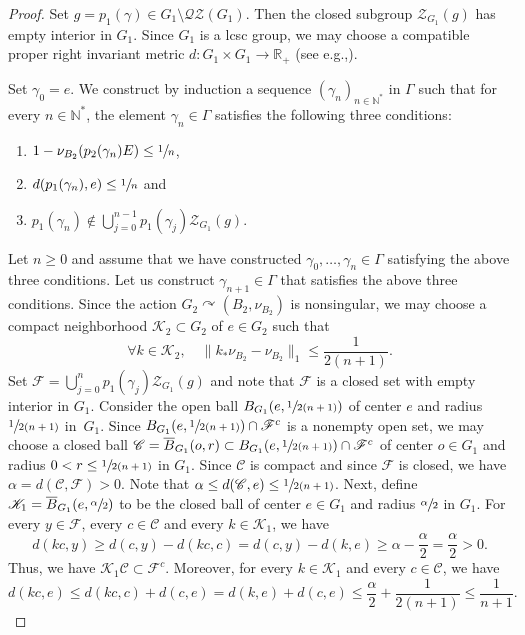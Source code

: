 \documentclass[11pt]{article}
\newcommand{\eg}{e.g.,\xspace}
\newenvironment{enumeratei}
{\bgroup\def\theenumi{\roman{enumi}}\def\theenumii{\arabic{enumii}}\begin{enumerate}}
{\end{enumerate}\egroup}
\theoremstyle{definition}
\newcommand{\R}{\mathbb{R}}
\newcommand{\N}{\mathbb{N}}
\begin{document}
\begin{proof}
Set $g = p_1(\gamma) \in G_1\setminus \mathscr{Q}\mathscr{Z}(G_1)$. Then the closed subgroup $\mathscr Z_{G_1}(g)$ has empty interior in $G_1$. Since $G_1$ is a lcsc group, we may choose a compatible proper right invariant metric $d : G_1 \times G_1 \to \R_+$ (see \eg \cite{St73}).

Set $\gamma_0 = e$. We construct by induction a sequence $(\gamma_n)_{n \in \N^*}$ in $\Gamma$ such that for every $n \in \N^*$, the element $\gamma_n \in \Gamma$ satisfies the following three conditions:
\begin{enumeratei}
\item
$1 - \nu_{B_2}(p_2(\gamma_n) E) \leq \sfrac{1}{n}$,
\item
$d(p_1(\gamma_n), e) \leq \sfrac{1}{n}$ and
\item
$p_1(\gamma_{n}) \notin \bigcup_{j = 0}^{n - 1} p_1(\gamma_j)\mathscr Z_{G_1}(g)$.
\end{enumeratei}
Let $n \geq 0$ and assume that we have constructed $\gamma_0, \dots, \gamma_n \in \Gamma$ satisfying the above three conditions. Let us construct $\gamma_{n + 1} \in \Gamma$ that satisfies the above three conditions. Since the action $G_2 \curvearrowright (B_2, \nu_{B_2})$ is nonsingular, we may choose a compact neighborhood $\mathscr K_2 \subset G_2$ of $e \in G_2$ such that
\[
\forall k \in \mathscr K_2, \quad \|{k}_\ast \nu_{B_2} - \nu_{B_2}\|_{1} \leq \frac{1}{2(n + 1)}.
\]
Set $\mathscr F = \bigcup_{j = 0}^n p_1(\gamma_j)\mathscr Z_{G_1}(g)$ and note that $\mathscr F$ is a closed set with empty interior in $G_1$. Consider the open ball $B_{G_1}(e, \sfrac{1}{2(n + 1)})$ of center $e$ and radius $\sfrac{1}{2(n + 1)}$ in~$G_1$. Since $B_{G_1}(e, \sfrac{1}{2(n + 1)}) \cap \mathscr F^c$ is a nonempty open set, we may choose a closed ball $\mathscr C = \overline B_{G_1}(o, r) \subset B_{G_1}(e, \sfrac{1}{2(n + 1)}) \cap \mathscr F^c$ of center $o \in G_1$ and radius $0 < r \leq \sfrac{1}{2(n + 1)}$ in $G_1$. Since $\mathscr C$ is compact and since $\mathscr F$ is closed, we have $\alpha = d(\mathscr C , \mathscr F) > 0$. Note that $\alpha \leq d(\mathscr C, e) \leq \sfrac{1}{2(n + 1)}$. Next, define $\mathscr K_1 = \overline B_{G_1}(e, \sfrac{\alpha}{2})$ to be the closed ball of center $e \in G_1$ and radius $\sfrac{\alpha}{2}$ in $G_1$. For every $y \in \mathscr F$, every $c \in \mathscr C$ and every $k \in \mathscr K_1$, we have
\[
d(kc, y) \geq d(c, y) - d(kc, c) = d(c, y) - d(k, e) \geq \alpha - \frac{\alpha}{2} = \frac{\alpha}{2} > 0.
\]
Thus, we have $\mathscr K_1 \mathscr C \subset \mathscr F^c$. Moreover, for every $k \in \mathscr K_1$ and every $c \in \mathscr C$, we have
\[
d(kc, e) \leq d(kc, c) + d(c, e) = d(k, e) + d(c, e) \leq \frac{\alpha}{2} + \frac{1}{2(n + 1)} \leq \frac{1}{n + 1}.
\]


\end{proof}
\end{document}
